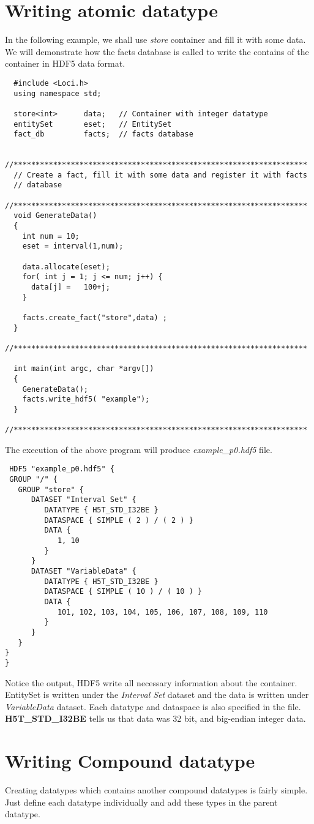 \section { Writing atomic datatype }
In the following example, we shall use {\em store} container and fill it with
some data. We will demonstrate how the facts database is called to write the
contains of the container in HDF5 data format.
\begin{verbatim}
  #include <Loci.h>
  using namespace std;
 
  store<int>      data;   // Container with integer datatype
  entitySet       eset;   // EntitySet
  fact_db         facts;  // facts database

  //*******************************************************************
  // Create a fact, fill it with some data and register it with facts
  // database
  //*******************************************************************
  void GenerateData()
  {
    int num = 10;
    eset = interval(1,num);

    data.allocate(eset);
    for( int j = 1; j <= num; j++) {
      data[j] =   100+j;
    }

    facts.create_fact("store",data) ;
  }
  //*******************************************************************

  int main(int argc, char *argv[])
  {
    GenerateData();
    facts.write_hdf5( "example");
  }
  //*******************************************************************
\end{verbatim}
The execution of the above program will produce {\em example\_p0.hdf5} file. 
\begin{verbatim}
 HDF5 "example_p0.hdf5" {
 GROUP "/" {
   GROUP "store" {
      DATASET "Interval Set" {
         DATATYPE { H5T_STD_I32BE }
         DATASPACE { SIMPLE ( 2 ) / ( 2 ) }
         DATA {
            1, 10
         }
      }
      DATASET "VariableData" {
         DATATYPE { H5T_STD_I32BE }
         DATASPACE { SIMPLE ( 10 ) / ( 10 ) }
         DATA {
            101, 102, 103, 104, 105, 106, 107, 108, 109, 110
         }
      }
   }
}
}
\end{verbatim}
\par Notice the output, HDF5 write all necessary information about the container. EntitySet is 
written under the {\em Interval Set} dataset and the data is written under {\em VariableData}
dataset. Each datatype and dataspace is also specified in the file. {\bf H5T\_STD\_I32BE} tells
us that data was 32 bit, and big-endian integer data.
%
\section { Writing Compound datatype}
Creating datatypes which contains another compound datatypes is fairly
simple. Just define each datatype individually and add these types in 
the parent datatype.

